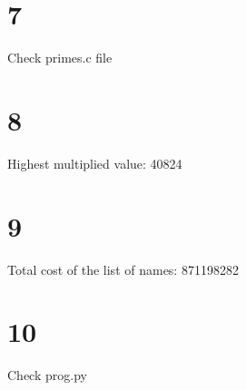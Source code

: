 \documentclass[letterpaper,10pt,titlepage]{article}
\begin{document}
\section{7}

Check primes.c file

\section{8}
Highest multiplied value: 40824

\section{9}
Total cost of the list of names: 871198282

\section{10}
Check prog.py
\end{document}
